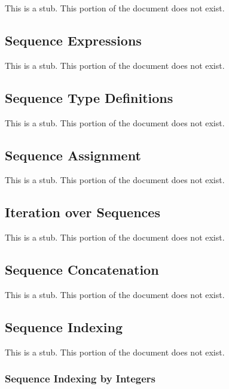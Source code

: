 \label{Sequences}

This is a stub.  This portion of the document does not exist.

\subsection{Sequence Expressions}
\label{Sequence_Expressions}

This is a stub.  This portion of the document does not exist.

\subsection{Sequence Type Definitions}
\label{Sequence_Type_Definitions}

This is a stub.  This portion of the document does not exist.

\subsection{Sequence Assignment}
\label{Sequence_Assignment}

This is a stub.  This portion of the document does not exist.

\subsection{Iteration over Sequences}
\label{Iteration_over_Sequences}

This is a stub.  This portion of the document does not exist.

\subsection{Sequence Concatenation}
\label{Sequence_Concatenation}

This is a stub.  This portion of the document does not exist.

\subsection{Sequence Indexing}
\label{Sequence_Indexing}

This is a stub.  This portion of the document does not exist.

\subsubsection{Sequence Indexing by Integers}
\label{Sequence_Indexing_by_Integers}

